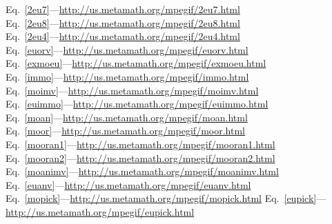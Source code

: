 \documentclass{slides}
\begin{document}
\begin{slide}

Eq.~\ref{2eu7}---\url{http://us.metamath.org/mpegif/2eu7.html}           \\
Eq.~\ref{2eu8}---\url{http://us.metamath.org/mpegif/2eu8.html}           \\
Eq.~\ref{2eu4}---\url{http://us.metamath.org/mpegif/2eu4.html}           \\
Eq.~\ref{euorv}---\url{http://us.metamath.org/mpegif/euorv.html}           \\
Eq.~\ref{exmoeu}---\url{http://us.metamath.org/mpegif/exmoeu.html}         \\
Eq.~\ref{immo}---\url{http://us.metamath.org/mpegif/immo.html}             \\
Eq.~\ref{moimv}---\url{http://us.metamath.org/mpegif/moimv.html}           \\
Eq.~\ref{euimmo}---\url{http://us.metamath.org/mpegif/euimmo.html}         \\
Eq.~\ref{moan}---\url{http://us.metamath.org/mpegif/moan.html}             \\
Eq.~\ref{moor}---\url{http://us.metamath.org/mpegif/moor.html}             \\
Eq.~\ref{mooran1}---\url{http://us.metamath.org/mpegif/mooran1.html}       \\
Eq.~\ref{mooran2}---\url{http://us.metamath.org/mpegif/mooran2.html}       \\
Eq.~\ref{moanimv}---\url{http://us.metamath.org/mpegif/moanimv.html}       \\
Eq.~\ref{euanv}---\url{http://us.metamath.org/mpegif/euanv.html}           \\
Eq.~\ref{mopick}---\url{http://us.metamath.org/mpegif/mopick.html}
Eq.~\ref{eupick}---\url{http://us.metamath.org/mpegif/eupick.html}         \\

\end{slide}
\end{document}
